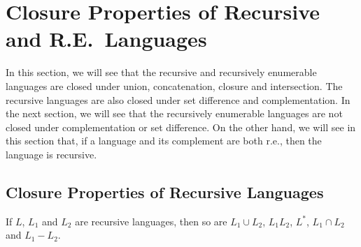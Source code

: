 \section{Closure Properties of Recursive and R.E.\ Languages}
\label{ClosurePropertiesOfRecursiveAndRELanguages}

In this section, we will see that the recursive and recursively
enumerable languages are closed under union, concatenation, closure
and intersection.  The recursive languages are also closed under set
difference and complementation.  In the next section, we will see that
the recursively enumerable languages are not closed under
complementation or set difference.  On the other hand, we will see in
this section that, if a language and its complement are both r.e.,
then the language is recursive.

\subsection{Closure Properties of Recursive Languages}

%

%
%
%
%
%
%
%
%
%
%
\begin{theorem}
\label{RecClose}

If $L$, $L_1$ and $L_2$ are recursive languages, then so are
$L_1\cup L_2$, $L_1L_2$, $L^*$, $L_1\cap L_2$ and $L_1-L_2$.
\end{theorem}

